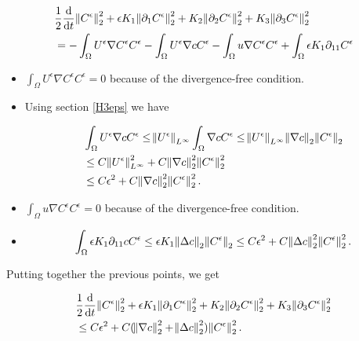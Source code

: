 \documentclass[11pt]{article}
\newcommand*\diff{\mathop{}\!\mathrm{d}}
\begin{document}
\begin{equation}
  \begin{split}
      & \frac{1}{2}\frac{\diff}{\diff t} \norm{C^\epsilon}_2^2 + \epsilon K_1 \norm{\partial_1 C^\epsilon}_2^2 + K_2 \norm{\partial_2 C^\epsilon}_2^2 + K_3 \norm{\partial_3 C^\epsilon}_2^2 \\
      & = - \int_\Omega U^\epsilon \nabla C^\epsilon C^\epsilon - \int_\Omega U^\epsilon \nabla c C^\epsilon - \int_\Omega u \nabla C^\epsilon C^\epsilon + \int_\Omega \epsilon K_1 \partial_{11} C^\epsilon
  \end{split}
\end{equation}

\begin{itemize}

  \item $\int_\Omega U^\epsilon \nabla C^\epsilon C^\epsilon = 0$ because of the divergence-free condition.
  
  \item Using section \ref{H3eps} we have
  
\begin{equation}
  \begin{split}
    & \int_\Omega U^\epsilon \nabla c C^\epsilon \leq \norm{U^\epsilon}_{L^\infty} \int_\Omega \nabla c C^\epsilon \leq \norm{U^\epsilon}_{L^\infty} \norm{\nabla c}_2 \norm{C^\epsilon}_2 \\
    & \leq C \norm{U^\epsilon}_{L^\infty}^2 + C \norm{\nabla c}_2^2 \norm{C^\epsilon}_2^2 \\
    & \leq C \epsilon^2 + C \norm{\nabla c}_2^2 \norm{C^\epsilon}_2^2.
  \end{split}
\end{equation}

  \item $\int_\Omega u \nabla C^\epsilon C^\epsilon = 0$ because of the divergence-free condition.
  
  \item 
\begin{equation}
    \int_\Omega \epsilon K_1 \partial_{11} c C^\epsilon \leq \epsilon K_1 \norm{\Delta c}_2 \norm{C^\epsilon}_2 \leq C \epsilon^2 + C \norm{\Delta c}_2^2 \norm{C^\epsilon}_2^2.
\end{equation}

\end{itemize}

Putting together the previous points, we get

\begin{equation}
  \begin{split}
      & \frac{1}{2}\frac{\diff}{\diff t} \norm{C^\epsilon}_2^2 + \epsilon K_1 \norm{\partial_1 C^\epsilon}_2^2 + K_2 \norm{\partial_2 C^\epsilon}_2^2 + K_3 \norm{\partial_3 C^\epsilon}_2^2 \\
      & \leq C \epsilon^2 + C (\norm{\nabla c}_2^2 + \norm{\Delta c}_2^2) \norm{C^\epsilon}_2^2.
  \end{split}
\end{equation}
\end{document}
